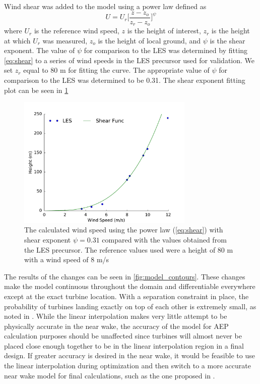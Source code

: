 \documentclass[conf]{new-aiaa}
\begin{document}
Wind shear was added to the model using a power law defined as
%
\begin{equation} \label{eq:shear}
	U = U_r\bigg[\frac{z-z_o}{z_r-z_o}\bigg]^\psi
\end{equation}
%
where $U_r$ is the reference wind speed, $z$ is the height of interest, $z_r$ is the height at which $U_r$ was measured, $z_o$ is the height of local ground, and $\psi$ is the shear exponent. The value of $\psi$ for comparison to the LES was determined by fitting \cref{eq:shear} to a series of wind speeds in the LES precursor used for validation. We set $z_r$ equal to 80 m for fitting the curve. The appropriate value of $\psi$ for comparison to the LES was determined to be 0.31.
The shear exponent fitting plot can be seen in \cref{fig:shear_fit}
%
\begin{figure}[ht]
	\centering
	\includegraphics[width=0.75\textwidth]{final_images/shear_fit.pdf}
	\caption{The calculated wind speed using the power law (\cref{eq:shear}) with shear exponent $\psi=0.31$ compared with the values obtained from the LES precursor. The reference values used were a height of 80 m with a wind speed of 8 m/s}
	\label{fig:shear_fit}
\end{figure}
%

The results of the changes can be seen in \cref{fig:model_contours}. These changes make the model continuous throughout the domain and differentiable everywhere except at the exact turbine location. With a separation constraint in place, the probability of turbines landing exactly on top of each other is extremely small, as noted in \cite{thomas2017}. While the linear interpolation makes very little attempt to be physically accurate in the near wake, the accuracy of the model for AEP calculation purposes should be unaffected since turbines will almost never be placed close enough together to be in the linear interpolation region in a final design. If greater accuracy is desired in the near wake, it would be feasible to use the linear interpolation during optimization and then switch to a more accurate near wake model for final calculations, such as the one proposed in \cite{keane2016}.
\end{document}
